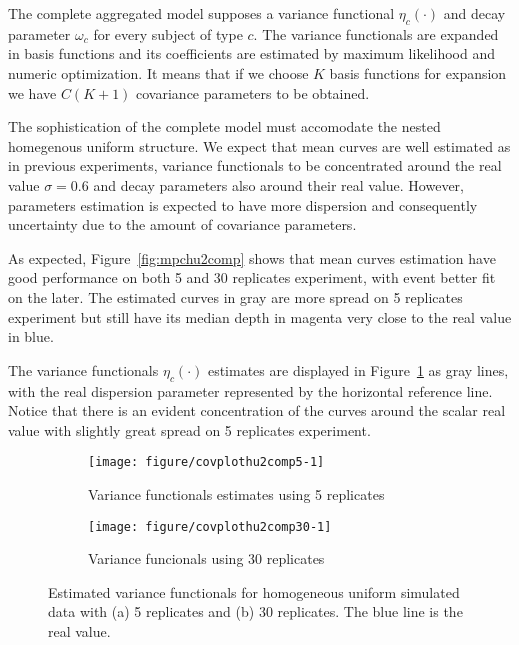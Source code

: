 The complete aggregated model supposes a variance functional $\eta_c(\cdot)$ and decay parameter $\omega_c$ for every subject of type $c$. The variance functionals are expanded in basis functions and its coefficients are estimated by maximum likelihood and numeric optimization. It means that if we choose $K$ basis functions for expansion we have $C(K+1)$ covariance parameters to be obtained.

The sophistication of the complete model must accomodate the nested homegenous uniform structure. We expect that mean curves are well estimated as in previous experiments, variance functionals to be concentrated around the real value $\sigma=0.6$ and decay parameters also around their real value. However, parameters estimation is expected to have more dispersion and consequently uncertainty due to the amount of covariance parameters.

As expected, Figure~\ref{fig:mpchu2comp} shows that mean curves estimation have good performance on both 5 and 30 replicates experiment, with event better fit on the later. The estimated curves in gray are more spread on 5  replicates experiment but still have its median depth in magenta very close to the real value in blue.




The variance functionals $\eta_c(\cdot)$ estimates are displayed in Figure~\ref{fig:covplot2comp} as gray lines, with the real dispersion parameter represented by the horizontal reference line. Notice that there is an evident concentration of the curves around the scalar real value with slightly great spread on 5 replicates experiment. 




\begin{figure}[t]
  \centering
  \begin{subfigure}{\textwidth}
    \centering
\begin{knitrout}
\color{fgcolor}
\texttt{[image: figure/covplothu2comp5-1]} 

\end{knitrout}
    \caption{Variance functionals estimates using 5 replicates}
  \end{subfigure}
  \begin{subfigure}{\textwidth}
    \centering
\begin{knitrout}
\color{fgcolor}
\texttt{[image: figure/covplothu2comp30-1]} 

\end{knitrout}
    \caption{Variance funcionals using 30 replicates}
  \end{subfigure}
  \caption{Estimated variance functionals for homogeneous uniform simulated data with (a) 5 replicates and (b) 30 replicates. The blue line is the real value.}
  \label{fig:covplot2comp}
\end{figure}


